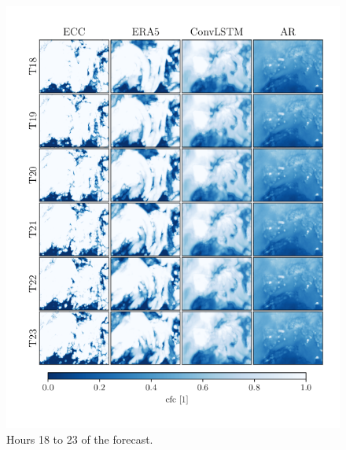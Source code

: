 \begin{figure}[ht]
    \centering
    \includegraphics{python_figs/comparing_seq_part_4_of4_jan2.png}
    \caption{Hours 18 to 23 of the forecast.}
    \label{fig:part4/4}
\end{figure}
\cleardoublepage
